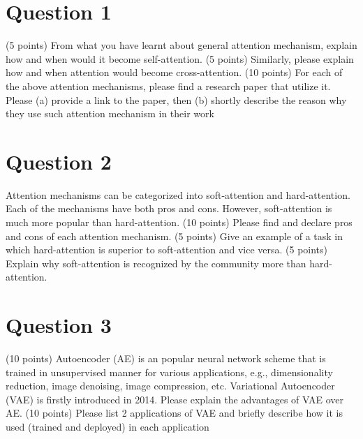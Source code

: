 \documentclass{article}
\begin{document}
\section*{Question 1}

(5 points) From what you have learnt about general attention mechanism, explain how and when would it
become self-attention.
(5 points) Similarly, please explain how and when attention would become cross-attention.
(10 points) For each of the above attention mechanisms, please find a research paper that utilize it. Please
(a) provide a link to the paper, then (b) shortly describe the reason why they use such attention mechanism
in their work


\section*{Question 2}

Attention mechanisms can be categorized into soft-attention and hard-attention. Each of the mechanisms
have both pros and cons. However, soft-attention is much more popular than hard-attention.
(10 points) Please find and declare pros and cons of each attention mechanism.
(5 points) Give an example of a task in which hard-attention is superior to soft-attention and vice versa.
(5 points) Explain why soft-attention is recognized by the community more than hard-attention.


\section*{Question 3}

(10 points) Autoencoder (AE) is an popular neural network scheme that is trained in unsupervised manner
for various applications, e.g., dimensionality reduction, image denoising, image compression, etc. Variational
Autoencoder (VAE) is firstly introduced in 2014. Please explain the advantages of VAE over AE.
(10 points) Please list 2 applications of VAE and briefly describe how it is used (trained and deployed) in
each application
\end{document}
